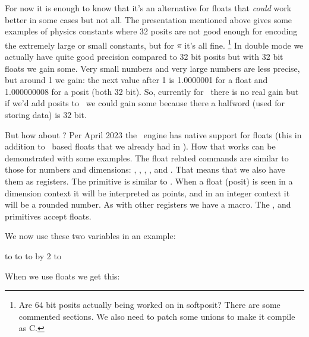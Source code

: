 For now it is enough to know that it's an alternative for floats that {\em could}
work better in some cases but not all. The presentation mentioned above gives
some examples of physics constants where 32 posits are not good enough for
encoding the extremely large or small constants, but for $\pi$ it's all fine.
\footnote {Are 64 bit posits actually being worked on in softposit? There are
some commented sections. We also need to patch some unions to make it compile as
C.} In double mode we actually have quite good precision compared to 32 bit
posits but with 32 bit floats we gain some. Very small numbers and very large
numbers are less precise, but around 1 we gain: the next value after 1 is
1.0000001 for a float and 1.000000008 for a posit (both 32 bit). So, currently
for \METAPOST\ there is no real gain but if we'd add posits to \TEX\ we could
gain some because there a halfword (used for storing data) is 32 bit.

But how about \TEX ? Per April 2023 the \LUAMETATEX\ engine has native support
for floats (this in addition to \LUA\ based floats that we already had in
\CONTEXT). How that works can be demonstrated with some examples. The float
related commands are similar to those for numbers and dimensions: \typ
{\floatdef}, \typ {\float}, \typ {\floatexpr}, \typ {\iffloat}, \typ
{\ifzerofloat} and \typ {\ifintervalfloat}. That means that we also have them as
registers. The \typ {\positdef} primitive is similar to \typ {\dimensiondef}.
When a float (posit) is seen in a dimension context it will be interpreted as
points, and in an integer context it will be a rounded number. As with other
registers we have a \typ {\newfloat} macro. The \typ {\advance}, \typ
{\multiply} and \typ {\divide} primitives accept floats.

\startbuffer[reset]
\scratchdimen=1.23456pt
\stopbuffer

\typebuffer[reset] \getbuffer[reset]

We now use these two variables in an example:

\startbuffer[dimensions]
\hbox to \the{}
\scratchdimen \dimexpr {}\relax
{}\hbox to \the{}
\advance \scratchdimen \scratchdimen
{}\hbox to \the{}
\multiply\scratchdimen by 2
\hbox to \the{}
\stopbuffer

\typebuffer[dimensions] \startlines\darkblue\tttf{}\stoplines

When we use floats we get this:

